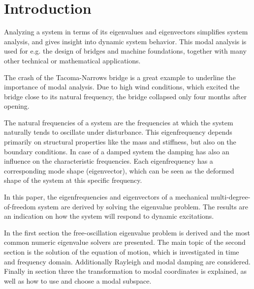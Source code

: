 \documentclass[conference]{journal}
\begin{document}
	\section{Introduction}
	Analyzing a system in terms of its eigenvalues and eigenvectors simplifies system analysis, and gives insight into dynamic system behavior.
	This modal analysis is used for e.g. the design of bridges and machine foundations, together with many other technical or mathematical applications. 
	
	The crash of the Tacoma-Narrows bridge is a great example to underline the importance of modal analysis. Due to high wind conditions, which excited the bridge close to its natural frequency, the bridge collapsed only four months after opening. 
	
	The natural frequencies of a system are the frequencies at which the system naturally tends to oscillate under disturbance. This  eigenfrequency depends primarily on structural properties like the mass and stiffness, but also on the boundary conditions. In case of a damped system the damping has also an influence on the characteristic frequencies. Each eigenfrequency has a corresponding mode shape (eigenvector), which can be seen as the deformed shape of the system at this specific frequency. 
	
	In this paper, the eigenfrequencies and eigenvectors of a mechanical multi-degree-of-freedom system are derived by solving the eigenvalue problem. The results are an indication on how the system will respond to dynamic excitations.
	
	In the first section the free-oscillation eigenvalue problem is derived and the most common numeric eigenvalue solvers are presented. The main topic of the second section is the solution of the equation of motion, which is investigated in time and frequency domain. Additionally Rayleigh and modal damping are considered. Finally in section three the transformation to modal coordinates is explained, as well as how to use and choose a modal subspace.
	
\end{document}
